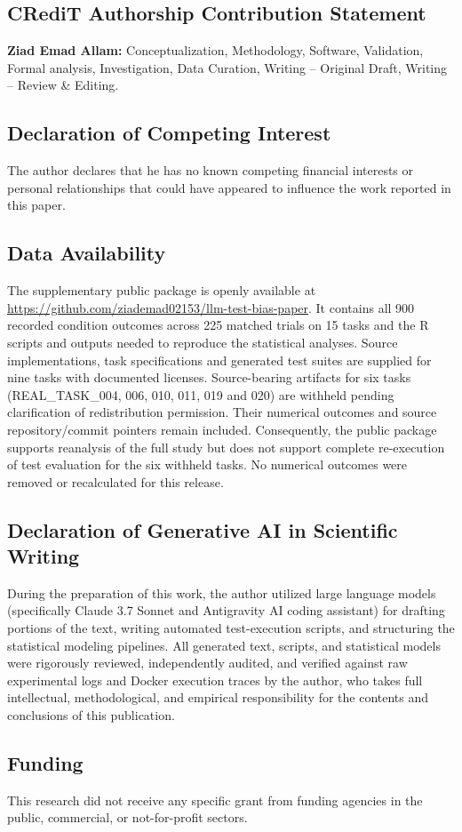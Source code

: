 \documentclass[11pt,a4paper]{article}
\begin{document}
\subsection*{CRediT Authorship Contribution Statement}
\textbf{Ziad Emad Allam:} Conceptualization, Methodology, Software, Validation, Formal analysis, Investigation, Data Curation, Writing -- Original Draft, Writing -- Review \& Editing.

\subsection*{Declaration of Competing Interest}
The author declares that he has no known competing financial interests or personal relationships that could have appeared to influence the work reported in this paper.

\subsection*{Data Availability}
The supplementary public package is openly available at \url{https://github.com/ziademad02153/llm-test-bias-paper}. It contains all 900 recorded condition outcomes across 225 matched trials on 15 tasks and the R scripts and outputs needed to reproduce the statistical analyses. Source implementations, task specifications and generated test suites are supplied for nine tasks with documented licenses. Source-bearing artifacts for six tasks (REAL\_TASK\_004, 006, 010, 011, 019 and 020) are withheld pending clarification of redistribution permission. Their numerical outcomes and source repository/commit pointers remain included. Consequently, the public package supports reanalysis of the full study but does not support complete re-execution of test evaluation for the six withheld tasks. No numerical outcomes were removed or recalculated for this release.

\subsection*{Declaration of Generative AI in Scientific Writing}
During the preparation of this work, the author utilized large language models (specifically Claude 3.7 Sonnet and Antigravity AI coding assistant) for drafting portions of the text, writing automated test-execution scripts, and structuring the statistical modeling pipelines. All generated text, scripts, and statistical models were rigorously reviewed, independently audited, and verified against raw experimental logs and Docker execution traces by the author, who takes full intellectual, methodological, and empirical responsibility for the contents and conclusions of this publication.

\subsection*{Funding}
This research did not receive any specific grant from funding agencies in the public, commercial, or not-for-profit sectors.

{\small


}
\end{document}
